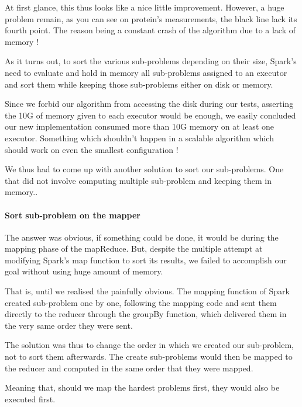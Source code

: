\documentclass{eplmastersthesis}
\begin{document}
At first glance, this thus looks like a nice little improvement. However, a huge problem remain, as you can see on protein's measurements, the black line lack its fourth point. The reason being a constant crash of the algorithm due to a lack of memory ! \newline

As it turns out, to sort the various sub-problems depending on their size, Spark's need to evaluate and hold in memory all sub-problems assigned to an executor and sort them while keeping those sub-problems either on disk or memory. \newline

Since we forbid our algorithm from accessing the disk during our tests, asserting the 10G of memory given to each executor would be enough, we easily concluded our new implementation consumed more than 10G memory on at least one executor. Something which shouldn't happen in a scalable algorithm which should work on even the smallest configuration ! \newline

We thus had to come up with another solution to sort our sub-problems. One that did not involve computing multiple sub-problem and keeping them in memory..

\paragraph{Sort sub-problem on the mapper}

The answer was obvious, if something could be done, it would be during the mapping phase of the mapReduce. But, despite the multiple attempt at modifying Spark's map function to sort its results, we failed to accomplish our goal without using huge amount of memory.

That is, until we realised the painfully obvious. The mapping function of Spark created sub-problem one by one, following the mapping code and sent them directly to the reducer through the groupBy function, which delivered them in the very same order they were sent. \newline

The solution was thus to change the order in which we created our sub-problem, not to sort them afterwards. The create sub-problems would then be mapped to the reducer and computed in the same order that they were mapped.\newline

Meaning that, should we map the hardest problems first, they would also be executed first. \newline
\end{document}
